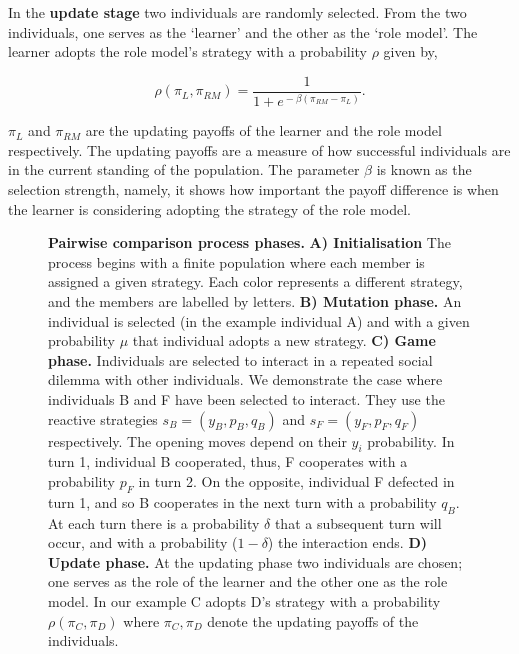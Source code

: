 \documentclass[11pt]{article}
\theoremstyle{plainCl1}
\theoremstyle{plainCl2}
\begin{document}
In the \textbf{update stage} two individuals are randomly selected. From
the two individuals, one  serves as the `learner' and the other as the `role
model'. The learner adopts the role model's strategy with a probability \(\rho\)
given by,

\begin{equation} \label{Eq:rho}
    \rho(\pi_{L}, \pi_{RM}) = \frac{1}{1\!+\! e^{\!-\!\beta (\pi_{RM}\!-\! \pi_{L})}}.
\end{equation}

\(\pi_{L}\) and \(\pi_{RM}\) are the updating payoffs of the learner and the
role model respectively. The updating payoffs are a measure of how successful
individuals are in the current standing of the population. The parameter
\(\beta\) is known as the selection strength, namely, it shows how important the
payoff difference is when the learner is considering adopting the strategy of
the role model.

\begin{figure}[!htbp]
    \centering
    
    \caption{\textbf{Pairwise comparison process phases.} \textbf{A) Initialisation} The process begins
    with a finite population where each member is assigned a given strategy.
    Each color represents a different strategy, and the members are labelled by
    letters. \textbf{B) Mutation phase.} An individual is selected (in the
    example individual A) and with a given probability \(\mu\) that individual
    adopts a new strategy. \textbf{C) Game phase.} Individuals are
    selected to interact in a repeated social dilemma with other individuals. We
    demonstrate the case where individuals B and F have been selected to
    interact. They use the reactive strategies \(s_{B} = (y_B, p_B, q_B)\) and
    \(s_{F} = (y_F, p_F, q_F)\) respectively. The opening moves depend on their
    \(y_i\) probability. In turn 1, individual B cooperated,
    thus, F cooperates with a probability \(p_{F}\) in turn 2. On the opposite,
    individual F defected in turn 1, and so B cooperates in the next turn with
    a probability \(q_{B}\). At each turn there is a probability \(\delta\) that a
    subsequent turn will occur, and with a probability (\(1- \delta\)) the interaction ends.
    \textbf{D) Update phase.} At the updating phase two individuals are chosen;
    one serves as the role of the learner and the other one as the 
    role model. In our example C adopts D's strategy with a probability
    \(\rho(\pi_{C}, \pi_{D})\) where \(\pi_{C}, \pi_{D}\) denote the updating
    payoffs of the individuals.}\label{fig:pairwise_phases}
\end{figure}
\end{document}
